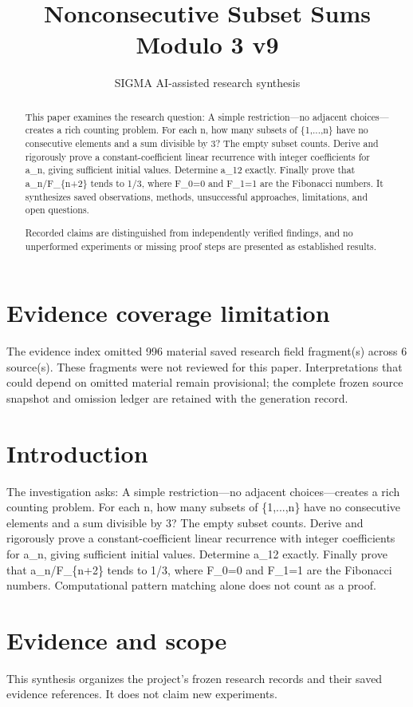 \documentclass[11pt]{article}
\title{Nonconsecutive Subset Sums Modulo 3 v9}
\date{}
\author{SIGMA AI-assisted research synthesis}
\begin{document}
\maketitle

\begin{abstract}
This paper examines the research question: A simple restriction—no adjacent choices—creates a rich counting problem. For each n, how many subsets of \{1,...,n\} have no consecutive elements and a sum divisible by 3? The empty subset counts. Derive and rigorously prove a constant-coefficient linear recurrence with integer coefficients for a\_n, giving sufficient initial values. Determine a\_12 exactly. Finally prove that a\_n/F\_\{n+2\} tends to 1/3, where F\_0=0 and F\_1=1 are the Fibonacci numbers. It synthesizes saved observations, methods, unsuccessful approaches, limitations, and open questions.

Recorded claims are distinguished from independently verified findings, and no unperformed experiments or missing proof steps are presented as established results.
\end{abstract}
\section*{Evidence coverage limitation}
The evidence index omitted 996 material saved research field fragment(s) across 6 source(s). These fragments were not reviewed for this paper. Interpretations that could depend on omitted material remain provisional; the complete frozen source snapshot and omission ledger are retained with the generation record.
\section{Introduction}
The investigation asks: A simple restriction—no adjacent choices—creates a rich counting problem. For each n, how many subsets of \{1,...,n\} have no consecutive elements and a sum divisible by 3? The empty subset counts. Derive and rigorously prove a constant-coefficient linear recurrence with integer coefficients for a\_n, giving sufficient initial values. Determine a\_12 exactly. Finally prove that a\_n/F\_\{n+2\} tends to 1/3, where F\_0=0 and F\_1=1 are the Fibonacci numbers. Computational pattern matching alone does not count as a proof.

\section{Evidence and scope}
This synthesis organizes the project's frozen research records and their saved evidence references. It does not claim new experiments.
\end{document}
